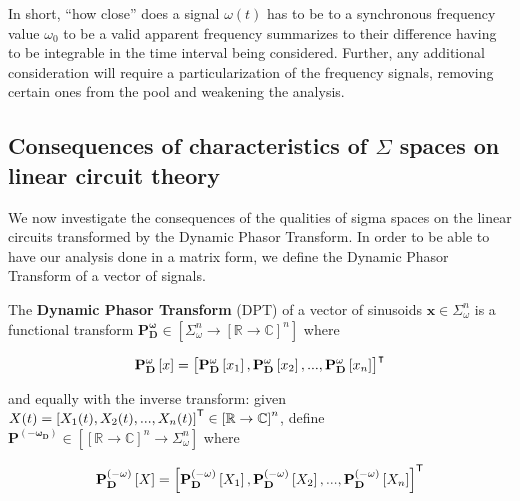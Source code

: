 	In short, ``how close'' does a signal $\omega(t)$ has to be to a synchronous frequency value $\omega_0$ to be a valid apparent frequency summarizes to their difference having to be integrable in the time interval being considered. Further, any additional consideration will require a particularization of the frequency signals, removing certain ones from the pool and weakening the analysis.

\subsection{Consequences of characteristics of $\Sigma$ spaces on linear circuit theory} %

	We now investigate the consequences of the qualities of sigma spaces on the linear circuits transformed by the Dynamic Phasor Transform. In order to be able to have our analysis done in a matrix form, we define the Dynamic Phasor Transform of a vector of signals.

\begin{definition} \label{def:dptransform_vector}%
	The \textbf{Dynamic Phasor Transform} (DPT) of a vector of sinusoids $\mathbf{x}\in\Sigma_{\omega}^n$ is a functional transform $\mathbf{P^\omega_D}\in \left[\Sigma_\omega^n  \to \left[\mathbb{R}\to\mathbb{C}\right]^n\right]$ where

\begin{equation} \mathbf{P_D^\omega}\left[x\right] = \left[\raisebox{3mm}{} \mathbf{P_D^\omega}\left[x_1\right],\mathbf{P_D^\omega}\left[x_2\right],...,\mathbf{P_D^\omega}\left[x_n\right]\right]^\intercal \end{equation}

	\noindent and equally with the inverse transform: given $X(t) = \left[X_1(t),X_2(t),...,X_n(t)\right]^{\mathsf{T}}\in\left[\mathbb{R}\to\mathbb{C}\right]^n$, define $\mathbf{P^{\left(-\omega_D\right)}}\in \left[\left[\mathbb{R}\to\mathbb{C}\right]^n \to \Sigma_\omega^n\right]$ where

\begin{equation} \mathbf{P_D^{\left(-\omega\right)}}\left[X\right] = \left[\raisebox{3mm}{} \mathbf{P_D^{\left(-\omega\right)}}\left[X_1\right],\mathbf{P_D^{\left(-\omega\right)}}\left[X_2\right],...,\mathbf{P_D^{\left(-\omega\right)}}\left[X_n\right]\right]^\transpose \end{equation}
\end{definition} %

